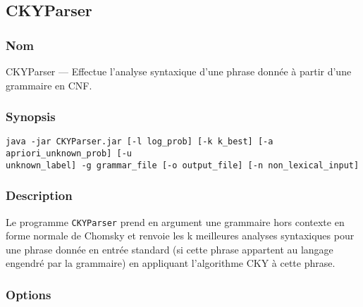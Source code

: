 \documentclass[12pt]{article}
\begin{document}
\subsection{CKYParser}
\subsubsection{Nom}
 
CKYParser --- Effectue l'analyse syntaxique d'une phrase donnée à partir d'une
grammaire en CNF.
 
\subsubsection{Synopsis}
 
{\ttfamily
\begin{verbatim}
java -jar CKYParser.jar [-l log_prob] [-k k_best] [-a apriori_unknown_prob] [-u
unknown_label] -g grammar_file [-o output_file] [-n non_lexical_input]
\end{verbatim}
}
 
\subsubsection{Description}
 
Le programme \texttt{CKYParser} prend en argument une grammaire hors contexte
en forme normale de Chomsky et renvoie les k meilleures analyses syntaxiques
pour une phrase donnée en entrée standard (si cette phrase appartent au langage
engendré par la grammaire) en appliquant l'algorithme CKY à cette phrase.

\subsubsection{Options}
\end{document}
